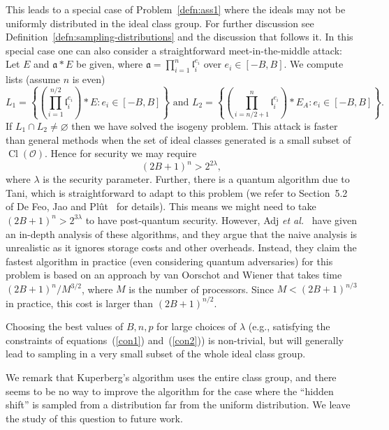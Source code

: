 \documentclass{llncs}
\newcommand{\OO}{\mathcal{O}}
\DeclareMathOperator{\Cl}{Cl}
\renewcommand{\a}{\mathfrak{a}}
\renewcommand{\l}{\mathfrak{l}}
\begin{document}
This leads to a special case of Problem~\ref{defn:ass1} where the ideals may not be uniformly distributed in the ideal class group. For further discussion see Definition~\ref{defn:sampling-distributions} and the discussion that follows it.
In this special case one can also consider a straightforward meet-in-the-middle attack: Let $E$ and $\a * E$ be given, where $\a = \prod_{i=1}^n \l_i^{e_i}$ over $e_i \in [-B, B]$.
We compute lists (assume $n$ is even)
\[
   L_1 = \left\{ \left( \prod_{i=1}^{n/2} \l_i^{e_i} \right) * E : e_i \in [-B,B] \right\} \text{ \ \  and \ \  }
   L_2 = \left\{ \left( \prod_{i=n/2 + 1}^{n} \l_i^{e_i} \right) * E_A : e_i \in [-B,B] \right\}.
\]
If $L_1 \cap L_2 \ne \varnothing$ then we have solved the isogeny problem.
This attack is faster than general methods when the set of ideal classes generated is a small subset of $\Cl( \OO )$.
Hence for security we may require
\begin{equation} \label{con2}
   (2B+1)^n > 2^{2 \lambda},
\end{equation}
where $\lambda$ is the security parameter.
Further, there is a quantum algorithm due to Tani, which is straightforward to adapt to this problem (we refer to Section~5.2 of De Feo, Jao and Pl{\^{u}}t~\cite{FJP14} for details).
This means we might need to take $(2B+1)^n > 2^{3 \lambda}$ to have post-quantum security.
However, Adj \emph{et al.}~\cite{adj+menezes+al-isogenies} have given an in-depth analysis of these algorithms, and they argue that the naive analysis is unrealistic as it ignores storage costs and other overheads.
Instead, they claim the fastest algorithm in practice (even considering quantum adversaries) for this problem is based on an approach by van Oorschot and Wiener that takes time $(2B+1)^n/M^{3/2}$, where $M$ is the number of processors.
Since $M < (2B+1)^{n/3}$ in practice, this cost is larger than $(2B+1)^{n/2}$.

Choosing the best values of $B,n,p$ for large choices of $\lambda$ (e.g., satisfying the constraints of equations~(\ref{con1}) and~(\ref{con2})) is non-trivial, but will generally lead to sampling in a very small subset of the whole ideal class group.


We remark that Kuperberg's algorithm uses the entire class group, and there seems to be no way to improve the algorithm for the case where the ``hidden shift'' is sampled from a distribution far from the uniform distribution.
We leave the study of this question to future work.
\end{document}
